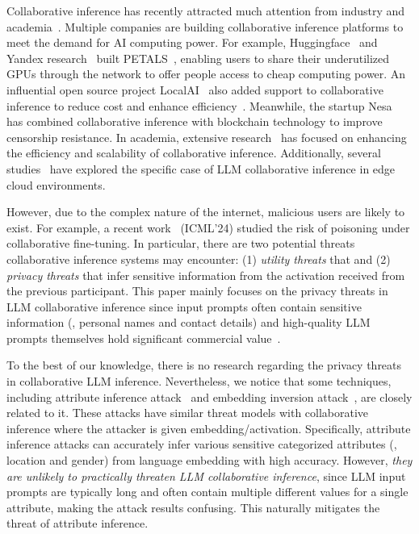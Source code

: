Collaborative inference has recently attracted much attention from industry and academia~\cite{PETALS,yuan2022decentralized,jiang2023hexgen,miao2023sdpipe}.
Multiple companies are building collaborative inference platforms to meet the demand for AI computing power. For example, Huggingface~\cite{Huggingface} and Yandex research~\cite{Yandex} built PETALS~\cite{PETALS,PETALS2}, enabling users to share their underutilized GPUs through the network to offer people access to cheap computing power.   An influential open source project LocalAI~\cite{localai} also added support to collaborative inference to reduce cost and enhance efficiency~\cite{localai_deml}. Meanwhile, the startup Nesa~\cite{NESA} has combined collaborative inference with blockchain technology to improve censorship resistance. In academia, extensive research~\cite{jiang2023hexgen,yuan2022decentralized,miao2023sdpipe,skyserve} has focused on enhancing the efficiency and scalability of collaborative inference. Additionally, several studies~\cite{edgecloud2,edgecloud3,edgecloud1} have explored the specific case of LLM collaborative inference in edge cloud environments.

However, due to the complex nature of the internet, malicious users are likely to exist. For example, a recent work~\cite{luposition} (ICML'24) studied the risk of poisoning under collaborative fine-tuning. In particular, there are two potential threats collaborative inference systems may encounter: (1) \emph{utility threats} that  and (2) \emph{privacy threats} that infer sensitive information from the activation received from the previous participant.  
This paper mainly focuses on the privacy threats in LLM collaborative inference since input prompts often contain sensitive information (\eg, personal names and contact details) and high-quality LLM prompts themselves hold significant commercial value~\cite{promptmarket}. 



To the best of our knowledge, there is no research regarding the privacy threats in collaborative LLM inference. Nevertheless, we notice that some techniques, including attribute inference attack~\cite{pan2020privacy,li2022you,lyu2020differentially} and embedding inversion attack~\cite{song2020information, Generative-embedding-inversion-attack, Sentence_inference_attack}, are closely related to it. These attacks have similar threat models with collaborative inference where the attacker is given embedding/activation. Specifically, attribute inference attacks can accurately infer various sensitive categorized attributes (\eg, location and gender) from language embedding with high accuracy. However, \emph{they are unlikely to practically threaten LLM collaborative inference}, since  LLM input prompts are typically long and often contain multiple different values for a single attribute, making the attack results confusing. This naturally mitigates the threat of attribute inference. 

